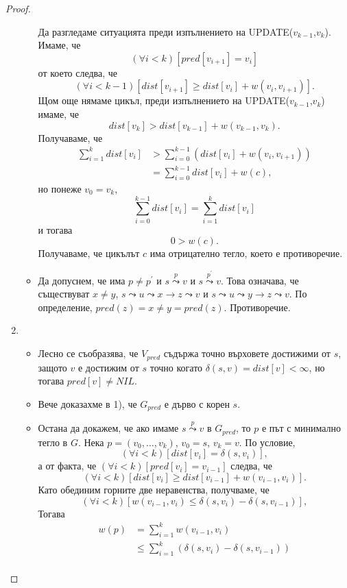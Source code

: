 \begin{proof}
\begin{enumerate}[1)]
\begin{itemize}
      Да разгледаме ситуацията преди изпълнението на UPDATE($v_{k-1}$,$v_{k}$).
      Имаме, че 
      \[(\forall i < k)[pred[v_{i+1}] = v_{i}]\]
      от което следва, че
      \[(\forall i < k-1)[dist[v_{i+1}] \geq dist[v_i] + w(v_i,v_{i+1})].\]
      Щом още нямаме цикъл, преди изпълнението на UPDATE($v_{k-1}$,$v_k$) имаме, че
      \[dist[v_{k}] > dist[v_{k-1}] + w(v_{k-1},v_k).\]
      Получаваме, че
      \begin{align*}
        \sum^{k}_{i = 1} dist[v_{i}] & > \sum^{k-1}_{i=0} (dist[v_i] + w(v_{i},v_{i+1}))\\
        & = \sum^{k-1}_{i=0} dist[v_i] + w(c),
      \end{align*}
      но понеже $v_0 = v_k$, 
      \[\sum^{k-1}_{i=0} dist[v_i] = \sum^{k}_{i=1} dist[v_i]\]
      и тогава
      \[0 > w(c).\]
      Получаваме, че цикълът $c$ има отрицателно тегло, което е противоречие.
    \item
      Да допуснем, че има $p \neq p^\prime$  и  $s\stackrel{p}{\leadsto} v$ и $s\stackrel{p^\prime}{\leadsto} v$.
      Това означава, че съществуват $x \neq y$,
      $s \leadsto u \leadsto x \to z \leadsto v$ и $s \leadsto u \leadsto y \to z \leadsto v$.
      По определение, $pred(z) = x \neq y = pred(z)$. Противоречие.
    \end{itemize}
  \item
    \begin{itemize}
    \item 
      Лесно се съобразява, че $V_{pred}$ съдържа точно върховете достижими от $s$,
      защото $v$ е достижим от $s$ точно когато $\delta(s,v) = dist[v] < \infty$, 
      но тогава $pred[v] \neq NIL$.
    \item
      Вече доказахме в 1), че $G_{pred}$ е дърво с корен $s$.
    \item
      Остана да докажем, че ако имаме $s\stackrel{p}{\leadsto} v$ в $G_{pred}$, 
      то $p$ е път с минимално тегло в $G$.
      Нека $p = (v_0,\dots,v_k)$, $v_0 = s$, $v_k = v$.
      По условие, 
      \[(\forall i < k)[dist[v_i] = \delta(s,v_i)],\]
      а от факта, че $(\forall i < k)[pred[v_i] = v_{i-1}]$ следва, че
      \[(\forall i < k)[dist[v_i] \geq dist[v_{i-1}] + w(v_{i-1},v_{i})].\]
      Като обединим горните две неравенства, получваме, че
      \[(\forall i < k)[w(v_{i-1},v_{i}) \leq \delta(s,v_{i}) - \delta(s,v_{i-1})],\]
      Тогава
      \begin{align*}
        w(p) & = \sum^k_{i=1} w(v_{i-1},v_{i})\\
        & \leq \sum^k_{i=1} (\delta(s,v_i)- \delta(s,v_{i-1}))\\

\end{align*}
\end{itemize}
\end{enumerate}
\end{proof}

